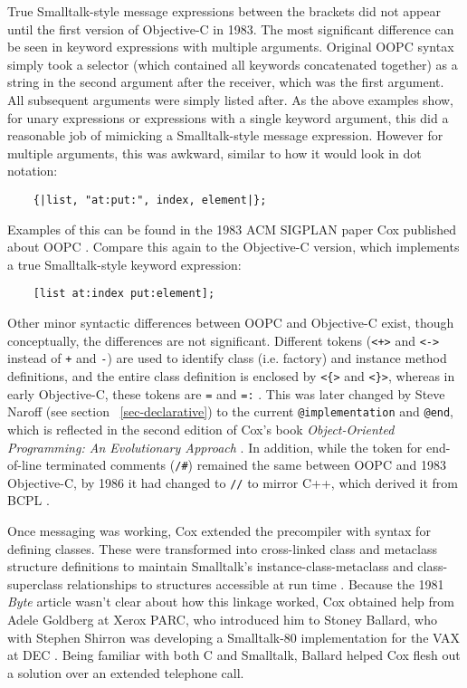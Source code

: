 \documentclass[acmsmall]{acmart}\settopmatter{}
\begin{document}
True Smalltalk-style message expressions between the brackets did not appear until the first version of Objective-C in 1983. The most significant difference can be seen in keyword expressions with multiple arguments. Original OOPC syntax simply took a selector (which contained all keywords concatenated together) as a string in the second argument after the receiver, which was the first argument. All subsequent arguments were simply listed after. As the above examples show, for unary expressions or expressions with a single keyword argument, this did a reasonable job of mimicking a Smalltalk-style message expression. However for multiple arguments, this was awkward, similar to how it would look in dot notation:
\begin{verbatim}
    {|list, "at:put:", index, element|};
\end{verbatim}
Examples of this can be found in the 1983 ACM SIGPLAN paper Cox published about OOPC \citep[16--18, 21]{cox_object_1983}.
Compare this again to the Objective-C version, which implements a true Smalltalk-style keyword expression:
\begin{verbatim}
    [list at:index put:element];
\end{verbatim}
Other minor syntactic differences between OOPC and Objective-C exist, though conceptually, the differences are not significant. Different tokens (\verb|<+>| and \verb|<->| instead of \verb|+| and \verb|-|) are used to identify class (i.e. factory) and instance method definitions, and the entire class definition is enclosed by \verb|<{>| and \verb|<}>|, whereas in early Objective-C, these tokens are \verb|=| and \verb|=:| \citetext{\citealp[17]{cox_object_1983}; \citealp[55]{cox_message/object_1984}; \citealp[84]{cox_object-oriented_1986}}. This was later changed by Steve Naroff (see section ~\ref{sec-declarative}) to the current \verb|@implementation| and \verb|@end|, which is reflected in the second edition of Cox's book \emph{Object-Oriented Programming: An Evolutionary Approach} \citep[88]{cox_object-oriented_1991}. In addition, while the token for end-of-line terminated comments (\verb|/#|) remained the same between OOPC and 1983 Objective-C, by 1986 it had changed to \verb|//| to mirror C++, which derived it from BCPL \citetext{\citealp[17]{cox_object_1983}; \citealp[55]{cox_message/object_1984}; \citealp[60--61]{cox_object-oriented_1986}; \citealp[21]{stroustrup_history_1993}}.

Once messaging was working, Cox extended the precompiler with syntax for defining classes. These were transformed into cross-linked class and metaclass structure definitions to maintain Smalltalk's instance-class-metaclass and class-superclass relationships to structures accessible at run time \citep{goldberg_smalltalk-80_1983}. Because the 1981 \emph{Byte} article wasn't clear about how this linkage worked, Cox obtained help from Adele Goldberg at Xerox PARC, who introduced him to Stoney Ballard, who with Stephen Shirron was developing a Smalltalk-80 implementation for the VAX at DEC \citep{krasner_smalltalk-80_1984}. Being familiar with both C and Smalltalk, Ballard helped Cox flesh out a solution over an extended telephone call. 
\end{document}
